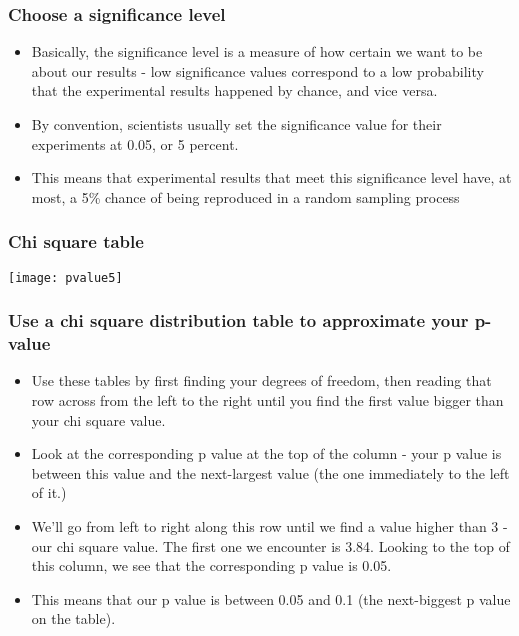 \begin{frame}
\frametitle{Choose a significance level}
\begin{itemize}
\item Basically, the significance level is a measure of how certain we want to be about our results - low significance values correspond to a low probability that the experimental results happened by chance, and vice versa.
\item By convention, scientists usually set the significance value for their experiments at 0.05, or 5 percent.
\item This means that experimental results that meet this significance level have, at most, a 5\% chance of being reproduced in a random sampling process

\end{itemize}

\end{frame}

\begin{frame}
\frametitle{Chi square table}

\begin{center}
\texttt{[image: pvalue5]}
\end{center}

\end{frame}

\begin{frame}
\frametitle{Use a chi square distribution table to approximate your p-value}
\begin{itemize}
\item Use these tables by first finding your degrees of freedom, then reading that row across from the left to the right until you find the first value bigger than your chi square value. 
\item Look at the corresponding p value at the top of the column - your p value is between this value and the next-largest value (the one immediately to the left of it.)
\item We'll go from left to right along this row until we find a value higher than 3 - our chi square value. The first one we encounter is 3.84. Looking to the top of this column, we see that the corresponding p value is 0.05. 
\item This means that our p value is between 0.05 and 0.1 (the next-biggest p value on the table).
\end{itemize}

\end{frame}

